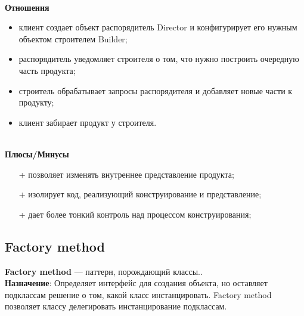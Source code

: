 \documentclass[a3paper,11pt]{report}
\begin{document}
\textbf{\\Отношения}
\begin{itemize}
\item клиент создает объект распорядитель Director и конфигурирует его нужным объектом строителем Builder;
\item распорядитель уведомляет строителя о том, что нужно построить очередную часть продукта;
\item строитель обрабатывает запросы распорядителя и добавляет новые части к продукту;
\item клиент забирает продукт у строителя.
\end{itemize}

\textbf{\\Плюсы/Минусы}
\begin{itemize}
\item [+] позволяет изменять внутреннее представление продукта;
\item [+] изолирует код, реализующий конструирование и представление;
\item [+] дает более тонкий контроль над процессом конструирования;
\end{itemize}

\newpage
\subsection{Factory method}

\large\textbf{Factory method} --- паттерн, порождающий классы..
\\
\large\textbf{Назначение}: Определяет интерфейс для создания объекта, но оставляет подклассам решение о том, какой класс инстанцировать. Factory method позволяет классу делегировать инстанцирование подклассам.
\\
\end{document}
